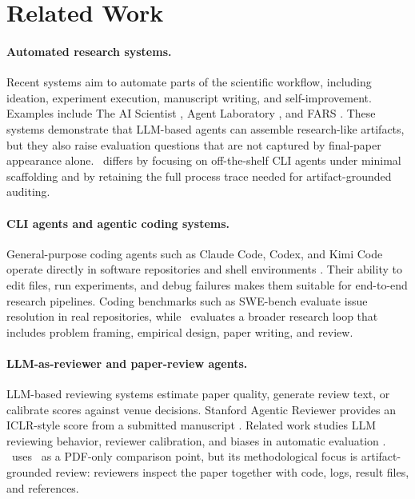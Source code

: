 \section{Related Work}

\paragraph{Automated research systems.}
Recent systems aim to automate parts of the scientific workflow, including ideation, experiment execution, manuscript writing, and self-improvement. Examples include The AI Scientist \citep{lu2024ai}, Agent Laboratory \citep{schmidgall2025agentlaboratory}, and FARS \citep{analemma2025fars}. These systems demonstrate that LLM-based agents can assemble research-like artifacts, but they also raise evaluation questions that are not captured by final-paper appearance alone. \ra\ differs by focusing on off-the-shelf CLI agents under minimal scaffolding and by retaining the full process trace needed for artifact-grounded auditing.

\paragraph{CLI agents and agentic coding systems.}
General-purpose coding agents such as Claude Code, Codex, and Kimi Code operate directly in software repositories and shell environments \citep{anthropic2026opus,anthropic2026claudecode,openai2026codex,moonshot2026kimi,moonshot2026kimicode}. Their ability to edit files, run experiments, and debug failures makes them suitable for end-to-end research pipelines. Coding benchmarks such as SWE-bench \citep{jimenez2024swebench} evaluate issue resolution in real repositories, while \ra\ evaluates a broader research loop that includes problem framing, empirical design, paper writing, and review.

\paragraph{LLM-as-reviewer and paper-review agents.}
LLM-based reviewing systems estimate paper quality, generate review text, or calibrate scores against venue decisions. Stanford Agentic Reviewer provides an ICLR-style score from a submitted manuscript \citep{stanford2026sar}. Related work studies LLM reviewing behavior, reviewer calibration, and biases in automatic evaluation \citep{liang2024llmjudge,zhou2024reviewer2}. \ra\ uses \sar\ as a PDF-only comparison point, but its methodological focus is artifact-grounded review: reviewers inspect the paper together with code, logs, result files, and references.


